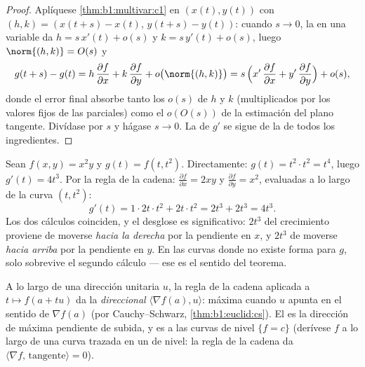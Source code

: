 \begin{proof}
Aplíquese \cref{thm:b1:multivar:c1} en $(x(t), y(t))$ con $(h, k) =
(x(t+s) - x(t),\, y(t+s) - y(t))$: cuando $s \to 0$, la 
en una variable da $h = s\,x'(t) + o(s)$ y $k = s\,y'(t)
+ o(s)$, luego $\norm{(h, k)} = O(s)$ y
\[
g(t+s) - g(t)
= h\,\frac{\partial f}{\partial x} + k\,\frac{\partial
f}{\partial y} + o\bigl(\norm{(h,k)}\bigr)
= s\,\Bigl(x'\,\frac{\partial f}{\partial x} +
y'\,\frac{\partial f}{\partial y}\Bigr) + o(s) ,
\]
donde el error final absorbe tanto los $o(s)$ de $h$ y $k$
(multiplicados por los valores fijos de las parciales) como el
$o(O(s))$ de la estimación del plano tangente. Divídase por $s$ y hágase
$s \to 0$. La  de $g'$ se sigue de la de todos los
ingredientes.
\end{proof}

\begin{example}
\label{ex:b1:multivar:chainrun}
Sean $f(x, y) = x^2 y$ y $g(t) = f(t, t^2)$. Directamente: $g(t) =
t^2\cdot t^2 = t^4$, luego $g'(t) = 4t^3$. Por la regla de la cadena:
$\frac{\partial f}{\partial x} = 2xy$ y $\frac{\partial
f}{\partial y} = x^2$, evaluadas a lo largo de la curva $(t, t^2)$:
\[
g'(t) = 1\cdot 2t\cdot t^2 + 2t\cdot t^2 = 2t^3 + 2t^3 = 4t^3 .
\]
Los dos cálculos coinciden, y el desglose es significativo: $2t^3$
del crecimiento proviene de moverse \emph{hacia la derecha} por la
pendiente en $x$, y $2t^3$ de moverse \emph{hacia arriba} por la
pendiente en $y$. En las curvas donde no existe forma  para $g$, solo
sobrevive el segundo cálculo --- ese es el sentido del teorema.
\end{example}

\begin{remark}
A lo largo de una dirección unitaria $u$, la regla de la cadena aplicada a
$t \mapsto f(a + tu)$ da la \emph{ direccional} $\langle \nabla f(a),
u\rangle$: máxima cuando $u$ apunta en el sentido de $\nabla f(a)$ (por
Cauchy--Schwarz, \cref{thm:b1:euclid:cs}). El  es la
dirección de máxima pendiente de subida, y es  a las curvas
de nivel $\{f = c\}$ (derívese $f$ a lo largo de una curva trazada en un
 de nivel: la regla de la cadena da $\langle\nabla f,\,
\text{tangente}\rangle = 0$).
\end{remark}

